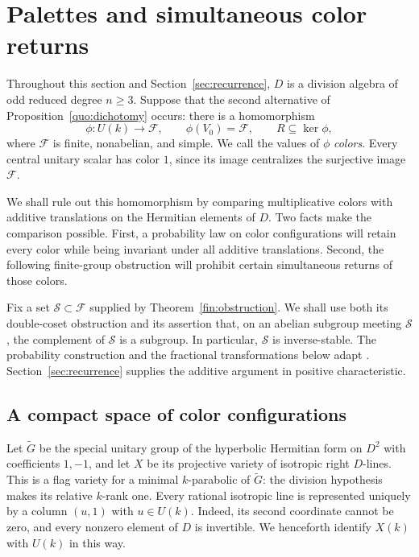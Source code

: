 \section{Palettes and simultaneous color returns}\label{sec:palettes}

Throughout this section and Section~\ref{sec:recurrence}, $D$ is a division
algebra of odd reduced degree $n\geq3$.  Suppose that the second alternative
of Proposition~\ref{quo:dichotomy} occurs: there is a homomorphism
\[
 \phi:U(k)\longrightarrow\mathcal F,
 \qquad \phi(V_0)=\mathcal F,\qquad R\subseteq\ker\phi,
\]
where $\mathcal F$ is finite, nonabelian, and simple.  We call the values of
$\phi$ \emph{colors}.  Every central unitary scalar has color $1$, since
its image centralizes the surjective image $\mathcal F$.

We shall rule out this homomorphism by comparing multiplicative colors
with additive translations on the Hermitian elements of $D$.  Two facts
make the comparison possible.  First, a probability law on color
configurations will retain every color while being invariant under all
additive translations.  Second, the following finite-group obstruction
will prohibit certain simultaneous returns of those colors.



Fix a set $\mathcal S\subset\mathcal F$ supplied by
Theorem~\ref{fin:obstruction}.  We shall use both its double-coset
obstruction and its assertion that, on an abelian subgroup meeting
$\mathcal S$, the complement of $\mathcal S$ is a subgroup.  In particular,
$\mathcal S$ is inverse-stable.  The probability construction and the
fractional transformations below adapt
\cite[Sections~5.2--5.4]{MPNF}.  Section~\ref{sec:recurrence} supplies the
additive argument in positive characteristic.

\subsection{A compact space of color configurations}

Let $\widetilde G$ be the special unitary group of the hyperbolic
Hermitian form on $D^2$ with coefficients $1,-1$, and let $X$ be its
projective variety of isotropic right $D$-lines.  This is a flag variety
for a minimal $k$-parabolic of $\widetilde G$: the division hypothesis
makes its relative $k$-rank one.  Every rational isotropic line is
represented uniquely by a column $(u,1)$ with $u\in U(k)$.  Indeed, its
second coordinate cannot be zero, and every nonzero element of $D$ is
invertible.  We henceforth identify $X(k)$ with $U(k)$ in this way.

